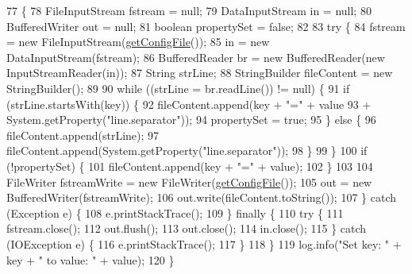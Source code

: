 \begin{DoxyCode}
77                                                              \{
78         FileInputStream fstream = null;
79         DataInputStream in = null;
80         BufferedWriter out = null;
81         \textcolor{keywordtype}{boolean} propertySet = \textcolor{keyword}{false};
82 
83         \textcolor{keywordflow}{try} \{
84             fstream = \textcolor{keyword}{new} FileInputStream(\hyperlink{classit_1_1isislab_1_1masonhelperdocumentation_1_1mason_1_1control_1_1_config_file_ac533dd01e862be359ae060d278daf1ea}{getConfigFile}());
85             in = \textcolor{keyword}{new} DataInputStream(fstream);
86             BufferedReader br = \textcolor{keyword}{new} BufferedReader(\textcolor{keyword}{new} InputStreamReader(in));
87             String strLine;
88             StringBuilder fileContent = \textcolor{keyword}{new} StringBuilder();
89 
90             \textcolor{keywordflow}{while} ((strLine = br.readLine()) != null) \{
91                 \textcolor{keywordflow}{if} (strLine.startsWith(key)) \{
92                     fileContent.append(key + \textcolor{stringliteral}{"="} + value
93                             + System.getProperty(\textcolor{stringliteral}{"line.separator"}));
94                     propertySet = \textcolor{keyword}{true};
95                 \} \textcolor{keywordflow}{else} \{
96                     fileContent.append(strLine);
97                     fileContent.append(System.getProperty(\textcolor{stringliteral}{"line.separator"}));
98                 \}
99             \}
100             \textcolor{keywordflow}{if} (!propertySet) \{
101                 fileContent.append(key + \textcolor{stringliteral}{"="} + value);
102             \}
103 
104             FileWriter fstreamWrite = \textcolor{keyword}{new} FileWriter(\hyperlink{classit_1_1isislab_1_1masonhelperdocumentation_1_1mason_1_1control_1_1_config_file_ac533dd01e862be359ae060d278daf1ea}{getConfigFile}());
105             out = \textcolor{keyword}{new} BufferedWriter(fstreamWrite);
106             out.write(fileContent.toString());
107         \} \textcolor{keywordflow}{catch} (Exception e) \{
108             e.printStackTrace();
109         \} \textcolor{keywordflow}{finally} \{
110             \textcolor{keywordflow}{try} \{
111                 fstream.close();
112                 out.flush();
113                 out.close();
114                 in.close();
115             \} \textcolor{keywordflow}{catch} (IOException e) \{
116                 e.printStackTrace();
117             \}
118         \}
119         log.info(\textcolor{stringliteral}{"Set key: "} + key + \textcolor{stringliteral}{" to value: "} + value);
120     \}
\end{DoxyCode}


